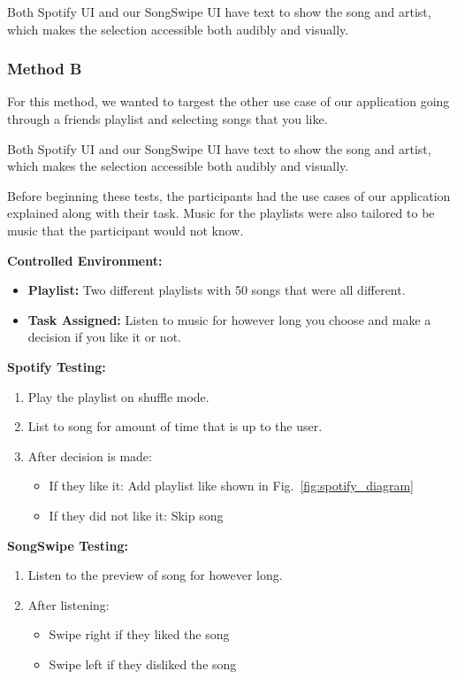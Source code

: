 \documentclass{article}
\begin{document}
    Both Spotify UI and our SongSwipe UI have text to show the song and artist, which makes the selection accessible both audibly and visually.

\subsubsection*{Method B}

For this method, we wanted to targest the other use case of our application going through a friends playlist and selecting songs that you like.

Both Spotify UI and our SongSwipe UI have text to show the song and artist, which makes the selection accessible both audibly and visually.
    
Before beginning these tests, the participants had the use cases of our application explained along with their task. Music for the playlists were also tailored to be music that the participant would not know.

    \textbf{Controlled Environment:}
    
    \begin{itemize}
    \item \textbf{Playlist:} Two different playlists with 50 songs that were all different.
    \item \textbf{Task Assigned:} Listen to music for however long you choose and make a decision if you like it or not.
    \end{itemize}

    \textbf{Spotify Testing:} 
    
    \begin{enumerate}
        \item Play the playlist on shuffle mode.
        \item List to song for amount of time that is up to the user.
        \item After decision is made:
            \begin{itemize}
                \item If they like it: Add playlist like shown in Fig.~\ref{fig:spotify_diagram}
                \item If they did not like it: Skip song
            \end{itemize}
    \end{enumerate}

    \textbf{SongSwipe Testing:}
    
    \begin{enumerate}
        \item Listen to the preview of song for however long.
        \item After listening:
            \begin{itemize}
                \item Swipe right if they liked the song
                \item Swipe left if they disliked the song
            \end{itemize}
    \end{enumerate}
\end{document}
